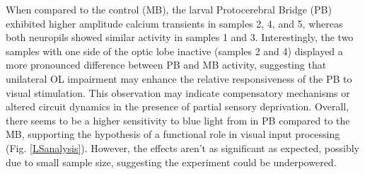 When compared to the control (MB), the larval Protocerebral Bridge (PB) exhibited higher amplitude calcium transients in samples 2, 4, and 5, whereas both neuropils showed similar activity in samples 1 and 3. Interestingly, the two samples with one side of the optic lobe inactive (samples 2 and 4) displayed a more pronounced difference between PB and MB activity, suggesting that unilateral OL impairment may enhance the relative responsiveness of the PB to visual stimulation. This observation may indicate compensatory mechanisms or altered circuit dynamics in the presence of partial sensory deprivation. 
Overall, there seems to be a higher sensitivity to blue light from in PB compared to the MB, supporting the hypothesis of a functional role in visual input processing (Fig. \ref{LSanalysis}). However, the effects aren't as significant as expected, possibly due to small sample size, suggesting the experiment could be underpowered.



